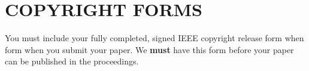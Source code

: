 \documentclass{article}
\begin{document}

\section{COPYRIGHT FORMS}
\label{sec:copyright}

You must include your fully completed, signed IEEE copyright release form when
form when you submit your paper. We {\bf must} have this form before your paper
can be published in the proceedings.



\end{document}
